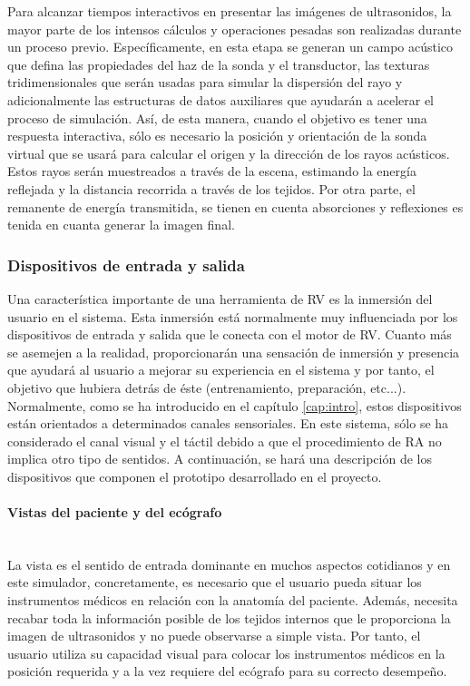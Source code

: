 Para alcanzar tiempos interactivos en presentar las imágenes de ultrasonidos, la mayor parte de los intensos cálculos y operaciones pesadas son realizadas durante un proceso previo. Específicamente, en esta etapa se generan un campo acústico que defina las propiedades del haz de la sonda y el transductor, las texturas tridimensionales que serán usadas para simular la dispersión del rayo y adicionalmente las estructuras de datos auxiliares que ayudarán a acelerar el proceso de simulación.
Así, de esta manera, cuando el objetivo es tener una respuesta interactiva, sólo es necesario la posición y orientación de la sonda virtual que se usará para calcular el origen y la dirección de los rayos acústicos. Estos rayos serán muestreados a través de la escena, estimando la energía reflejada y la distancia recorrida a través de los tejidos. Por otra parte, el remanente de energía transmitida, se tienen en cuenta absorciones y reflexiones es tenida en cuanta generar la imagen final.

\subsubsection{Dispositivos de entrada y salida}

Una característica importante de una herramienta de \ac{RV} es la inmersión del usuario en el sistema. Esta inmersión está normalmente muy influenciada por los dispositivos de entrada y salida que le conecta con el motor de \ac{RV}. Cuanto más se asemejen a la realidad, proporcionarán una sensación de inmersión y presencia que ayudará al usuario a mejorar su experiencia en el sistema y por tanto, el objetivo que hubiera detrás de éste (entrenamiento, preparación, etc...). Normalmente, como se ha introducido en el capítulo \ref{cap:intro}, estos dispositivos están orientados a determinados canales sensoriales. En este sistema, sólo se ha considerado el canal visual y el táctil debido a que el procedimiento de \ac{RA} no implica otro tipo de sentidos. A continuación, se hará una descripción de los dispositivos que componen el prototipo desarrollado en el proyecto.

\paragraph{Vistas del paciente y del ecógrafo}\mbox{}\\

La vista es el sentido de entrada dominante en muchos aspectos cotidianos y en este simulador, concretamente, es necesario que el usuario pueda situar los instrumentos médicos en relación con la anatomía del paciente. Además, necesita recabar toda la información posible de los tejidos internos que le proporciona la imagen de ultrasonidos y no puede observarse a simple vista. Por tanto, el usuario utiliza su capacidad visual para colocar los instrumentos médicos en la posición requerida y a la vez requiere del ecógrafo para su correcto desempeño.

